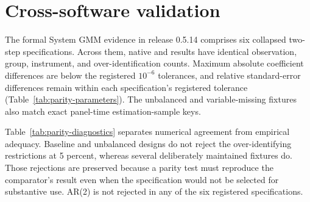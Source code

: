 \documentclass[article]{jss}
\begin{document}
\begin{table}[t!]
\centering
\small
\setlength{\tabcolsep}{4.5pt}
\renewcommand{\arraystretch}{1.16}

\caption{\label{tab:controlled-gmm} Controlled Difference GMM and System GMM results. Source: Author's computation with systemgmmkit 1.0.0 (Artifact 22). Notes: Two-step collapsed specifications. Standard errors are in parentheses. AR and over-identification entries are p-values; diagnostic non-rejection is not proof of validity.}
\end{table}


\section{Cross-software validation}
The formal System GMM evidence in release 0.5.14 comprises six collapsed two-step specifications. Across them,
native and  results have identical observation, group, instrument, and over-identification counts. Maximum
absolute coefficient differences are below the registered $10^{-6}$ tolerances, and relative standard-error
differences remain within each specification's registered tolerance (Table~\ref{tab:parity-parameters}).
The unbalanced and variable-missing fixtures also match exact panel-time estimation-sample keys.

\begin{table}[t!]
\centering
\small
\setlength{\tabcolsep}{4.5pt}
\renewcommand{\arraystretch}{1.16}

\caption{\label{tab:parity-parameters} System GMM parameter and count parity with Stata xtabond2. Source: Author's computation from the signed v0.5.14 release certificate (Artifact 24). Notes: All six release-certified specifications pass their registered tolerances. Exact sample-key matching is required for the unbalanced and variable-missing designs; Not required means that gate was not registered for the four balanced fixtures.}
\end{table}


Table~\ref{tab:parity-diagnostics} separates numerical agreement from empirical adequacy. Baseline and
unbalanced designs do not reject the over-identifying restrictions at 5 percent, whereas several deliberately
maintained fixtures do. Those rejections are preserved because a parity test must reproduce the comparator's
result even when the specification would not be selected for substantive use. AR(2) is not rejected in any of
the six registered specifications.
\end{document}
